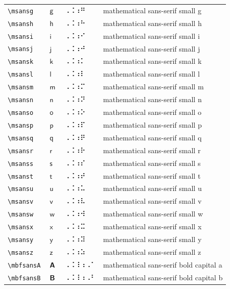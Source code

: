\documentclass[oneside]{article}
\begin{document}
\begin{longtable}{llll}
\verb|\msansg| & $\msansg$ &  ⠠⠨⠰⠛  & {mathematical sans-serif small g} \\[2ex]
\verb|\msansh| & $\msansh$ &  ⠠⠨⠰⠓  & {mathematical sans-serif small h} \\[2ex]
\verb|\msansi| & $\msansi$ &  ⠠⠨⠰⠊  & {mathematical sans-serif small i} \\[2ex]
\verb|\msansj| & $\msansj$ &  ⠠⠨⠰⠚  & {mathematical sans-serif small j} \\[2ex]
\verb|\msansk| & $\msansk$ &  ⠠⠨⠰⠅  & {mathematical sans-serif small k} \\[2ex]
\verb|\msansl| & $\msansl$ &  ⠠⠨⠰⠇  & {mathematical sans-serif small l} \\[2ex]
\verb|\msansm| & $\msansm$ &  ⠠⠨⠰⠍  & {mathematical sans-serif small m} \\[2ex]
\verb|\msansn| & $\msansn$ &  ⠠⠨⠰⠝  & {mathematical sans-serif small n} \\[2ex]
\verb|\msanso| & $\msanso$ &  ⠠⠨⠰⠕  & {mathematical sans-serif small o} \\[2ex]
\verb|\msansp| & $\msansp$ &  ⠠⠨⠰⠏  & {mathematical sans-serif small p} \\[2ex]
\verb|\msansq| & $\msansq$ &  ⠠⠨⠰⠟  & {mathematical sans-serif small q} \\[2ex]
\verb|\msansr| & $\msansr$ &  ⠠⠨⠰⠗  & {mathematical sans-serif small r} \\[2ex]
\verb|\msanss| & $\msanss$ &  ⠠⠨⠰⠎  & {mathematical sans-serif small s} \\[2ex]
\verb|\msanst| & $\msanst$ &  ⠠⠨⠰⠞  & {mathematical sans-serif small t} \\[2ex]
\verb|\msansu| & $\msansu$ &  ⠠⠨⠰⠥  & {mathematical sans-serif small u} \\[2ex]
\verb|\msansv| & $\msansv$ &  ⠠⠨⠰⠧  & {mathematical sans-serif small v} \\[2ex]
\verb|\msansw| & $\msansw$ &  ⠠⠨⠰⠺  & {mathematical sans-serif small w} \\[2ex]
\verb|\msansx| & $\msansx$ &  ⠠⠨⠰⠭  & {mathematical sans-serif small x} \\[2ex]
\verb|\msansy| & $\msansy$ &  ⠠⠨⠰⠽  & {mathematical sans-serif small y} \\[2ex]
\verb|\msansz| & $\msansz$ &  ⠠⠨⠰⠵  & {mathematical sans-serif small z} \\[2ex]
\verb|\mbfsansA| & $\mbfsansA$ &  ⠠⠨⠸⠰⠠⠁  & {mathematical sans-serif bold capital a} \\[2ex]
\verb|\mbfsansB| & $\mbfsansB$ &  ⠠⠨⠸⠰⠠⠃  & {mathematical sans-serif bold capital b} \\[2ex]

\end{longtable}
\end{document}
